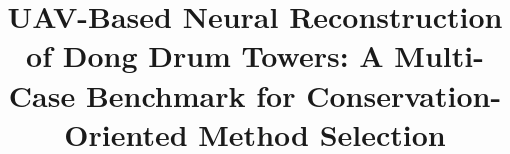 \documentclass[journal,onecolumn,11pt]{IEEEtran}
\begin{document}
\title{UAV-Based Neural Reconstruction of Dong Drum Towers: A Multi-Case Benchmark for Conservation-Oriented Method Selection}

\author{
}

\maketitle












\nocite{*}


\appendices

\end{document}
